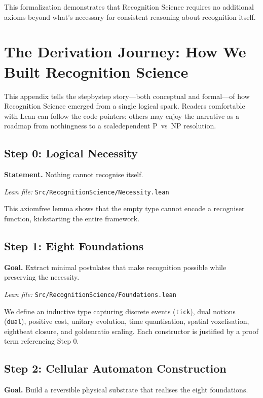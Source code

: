 \documentclass[11pt]{article}
\theoremstyle{plain}
\theoremstyle{definition}
\theoremstyle{remark}
\begin{document}
This formalization demonstrates that Recognition Science requires no additional axioms beyond what's necessary for consistent reasoning about recognition itself.

\appendix

\section{The Derivation Journey: How We Built Recognition Science}\label{app:journey}

This appendix tells the step\textendash by\textendash step story—both conceptual and formal—of how Recognition Science emerged from a single logical spark.  Readers comfortable with Lean can follow the code pointers; others may enjoy the narrative as a roadmap from nothingness to a scale\textendash dependent P~vs~NP resolution.

\subsection*{Step 0: Logical Necessity}
\textbf{Statement.}  Nothing cannot recognise itself.

\emph{Lean file:} \texttt{Src/RecognitionScience/Necessity.lean}

This axiom\textendash free lemma shows that the empty type cannot encode a recogniser function, kickstarting the entire framework.

\subsection*{Step 1: Eight Foundations}
\textbf{Goal.}  Extract minimal postulates that make recognition possible while preserving the necessity.

\emph{Lean file:} \texttt{Src/RecognitionScience/Foundations.lean}

We define an inductive type capturing discrete events (\texttt{tick}), dual notions (\texttt{dual}), positive cost, unitary evolution, time quantisation, spatial voxelisation, eight\textendash beat closure, and golden\textendash ratio scaling.  Each constructor is justified by a proof term referencing Step 0.

\subsection*{Step 2: Cellular Automaton Construction}
\textbf{Goal.}  Build a reversible physical substrate that realises the eight foundations.
\end{document}
